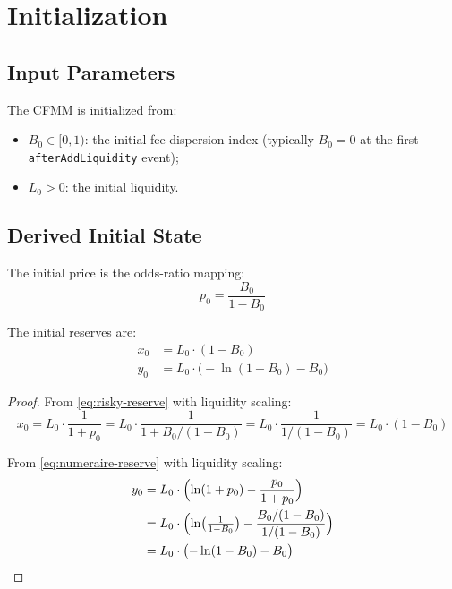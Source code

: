 
\section{Initialization}\label{sec:initialization}

\subsection{Input Parameters}

The CFMM is initialized from:
\begin{itemize}
  \item $B_0 \in [0, 1)$: the initial fee dispersion index (typically $B_0 = 0$
        at the first \texttt{afterAddLiquidity} event);
  \item $L_0 > 0$: the initial liquidity.
\end{itemize}

\subsection{Derived Initial State}

\begin{proposition}\label{prop:init-price}
The initial price is the odds-ratio mapping:
\begin{equation}\label{eq:init-price}
  p_0 = \frac{B_0}{1 - B_0}
\end{equation}
\end{proposition}

\begin{proposition}\label{prop:init-reserves}
The initial reserves are:
\begin{align}
  x_0 &= L_0 \cdot (1 - B_0) \label{eq:init-x}\\
  y_0 &= L_0 \cdot \bigl(-\ln(1 - B_0) - B_0\bigr) \label{eq:init-y}
\end{align}
\end{proposition}

\begin{proof}
From \eqref{eq:risky-reserve} with liquidity scaling:
\[
  x_0 = L_0 \cdot \frac{1}{1 + p_0}
      = L_0 \cdot \frac{1}{1 + B_0/(1-B_0)}
      = L_0 \cdot \frac{1}{1/(1-B_0)}
      = L_0 \cdot (1 - B_0)
\]

From \eqref{eq:numeraire-reserve} with liquidity scaling:
\begin{align*}
  y_0 &= L_0 \cdot \Bigl(\ln(1 + p_0) - \frac{p_0}{1 + p_0}\Bigr) \\
      &= L_0 \cdot \Bigl(\ln\bigl(\tfrac{1}{1-B_0}\bigr) - \frac{B_0/(1-B_0)}{1/(1-B_0)}\Bigr) \\
      &= L_0 \cdot \bigl(-\ln(1 - B_0) - B_0\bigr) \qedhere
\end{align*}
\end{proof}


